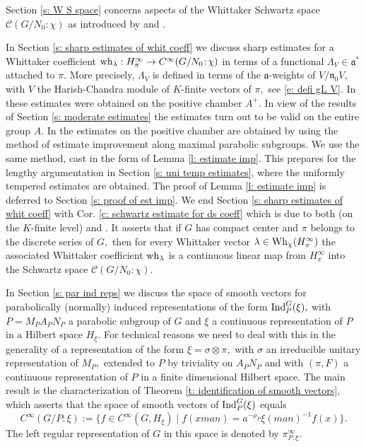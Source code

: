 \documentclass[12pt,a4paper]{article}
\def\gl{\lambda}
\def\gs{\sigma}
\def\got#1{\mathfrak #1}
\def\fa{{\got a}}
\def\fn{{\got n}}
\def\to{\rightarrow}
\def\cC{{\mathcal C}}
\numberwithin{Thm}{section}
\numberwithin{equation}{section}
\def\Ind{{\rm Ind}}
\def\Wh{{\rm Wh}}
\def\gL{\Lambda}
\numberwithin{equation}{section}
\def\gL{\Lambda}
\def\wh{{\rm wh}}
\def\col{\!:\!}
\def\cchi{\chi}
\begin{document}
Section \ref{s: W S space} concerns aspects of the Whittaker Schwartz space $\cC(G/N_0\col \cchi)$ as introduced by \cite{HCwhit} and \cite{Wrrg2}.  

In Section \ref{s: sharp estimates of whit coeff}
we discuss sharp estimates for a Whittaker 
coefficient $\wh_\gl: H_\pi^\infty \to C^\infty(G/N_0\col \cchi)$  in terms of a functional 
$\gL_V \in \fa^*$ attached to $\pi.$ More precisely, $\gL_V$ is defined in terms of 
the $\fa$-weights of $V / \fn_0 V,$ with $V$ 
the Harish-Chandra module of $K$-finite vectors of $\pi,$ see \ref{e: defi gL V}. In  \cite{Wrrg2} these estimates
were obtained on the positive chamber $A^+.$ In view of the results of 
Section \ref{s: moderate estimates}  
the estimates turn out to be valid on the entire group $A.$ In \cite{Wrrg2} the estimates on the positive 
chamber are obtained by using the method of estimate improvement along maximal parabolic subgroups. We use the same method, cast in the form of Lemma \ref{l: estimate imp}. This prepares
for the lengthy argumentation
in Section \ref{s: uni temp estimates}, where the uniformly tempered estimates are obtained.
The proof of Lemma \ref{l: estimate imp} is deferred to Section \ref{s: proof of est imp}.
We end Section \ref{s: sharp estimates of whit coeff} with Cor. \ref{c: schwartz estimate for ds coeff} which is due to both \cite{HCwhit} (on the $K$-finite level)
and \cite{Wrrg2}. It asserts that if $G$ has compact center and $\pi$ 
belongs to the discrete series of $G,$ then for every Whittaker vector $\gl \in \Wh_\cchi(H_\pi^\infty)$ 
the associated Whittaker coefficient $\wh_\gl$ is a continuous linear map
from $H_\pi^\infty$ into the Schwartz space
$\cC(G/N_0\col \cchi).$ 

In Section \ref {s: par ind reps} we discuss the space of smooth vectors 
for parabolically (normally) induced representations of the form 
$\Ind_P^G(\xi),$ with $P = M_P A_P N_P$ a parabolic subgroup of $G$ 
and $\xi$ a continuous representation of $P$ in a Hilbert space $H_\xi.$ 
For technical reasons we need to deal with this
in the generality of a representation of the form  $\xi = \gs \otimes \pi,$ with $\gs$ an irreducible  unitary representation
of $M_P,$ extended to $P$ by triviality on $A_P N_P$ and with $(\pi, F)$ a continuous  
representation of $P$ in a finite dimensional Hilbert space.
The main result is the characterization of Theorem
 \ref{t: identification of smooth vectors}, which asserts that the space of smooth vectors 
of $\Ind_P^G(\xi)$ equals 
\begin{equation}
\label{e: smooth vectors}
C^\infty(G/P:\xi):= \{f\in C^\infty(G,  H_\xi) \mid f(x man) = a^{-\rho_P} \xi(man )^{-1} f(x)\}.
\end{equation}  
The left regular representation of $G$ in this space is denoted by $\pi_{P,\xi}^\infty.$ 
\end{document}
